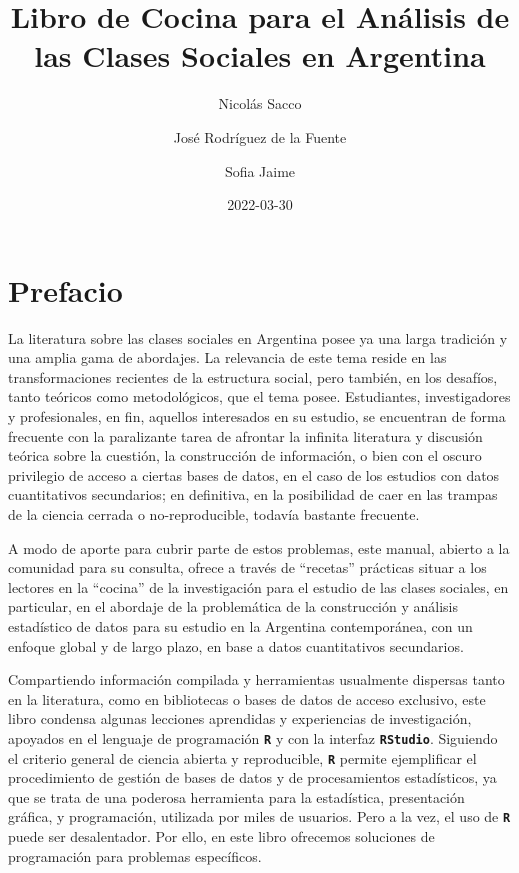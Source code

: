 \documentclass[
]{article}
\title{Libro de Cocina para el Análisis de las Clases Sociales en Argentina}
\author{Nicolás Sacco \and José Rodríguez de la Fuente \and Sofia Jaime}
\date{2022-03-30}
\begin{document}
\maketitle

{
\setcounter{tocdepth}{2}
\tableofcontents
}
\hypertarget{prefacio}{%
\section*{Prefacio}\label{prefacio}}

La literatura sobre las clases sociales en Argentina posee ya una larga tradición y una amplia gama de abordajes. La relevancia de este tema reside en las transformaciones recientes de la estructura social, pero también, en los desafíos, tanto teóricos como metodológicos, que el tema posee. Estudiantes, investigadores y profesionales, en fin, aquellos interesados en su estudio, se encuentran de forma frecuente con la paralizante tarea de afrontar la infinita literatura y discusión teórica sobre la cuestión, la construcción de información, o bien con el oscuro privilegio de acceso a ciertas bases de datos, en el caso de los estudios con datos cuantitativos secundarios; en definitiva, en la posibilidad de caer en las trampas de la ciencia cerrada o no-reproducible, todavía bastante frecuente.

A modo de aporte para cubrir parte de estos problemas, este manual, abierto a la comunidad para su consulta, ofrece a través de ``recetas'' prácticas situar a los lectores en la ``cocina'' de la investigación para el estudio de las clases sociales, en particular, en el abordaje de la problemática de la construcción y análisis estadístico de datos para su estudio en la Argentina contemporánea, con un enfoque global y de largo plazo, en base a datos cuantitativos secundarios.

Compartiendo información compilada y herramientas usualmente dispersas tanto en la literatura, como en bibliotecas o bases de datos de acceso exclusivo, este libro condensa algunas lecciones aprendidas y experiencias de investigación, apoyados en el lenguaje de programación \textbf{\texttt{R}} y con la interfaz \textbf{\texttt{RStudio}}. Siguiendo el criterio general de ciencia abierta y reproducible, \textbf{\texttt{R}} permite ejemplificar el procedimiento de gestión de bases de datos y de procesamientos estadísticos, ya que se trata de una poderosa herramienta para la estadística, presentación gráfica, y programación, utilizada por miles de usuarios. Pero a la vez, el uso de \textbf{\texttt{R}} puede ser desalentador. Por ello, en este libro ofrecemos soluciones de programación para problemas específicos.
\end{document}
